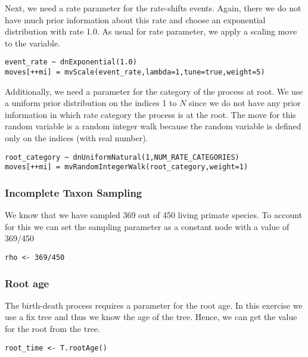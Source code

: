 Next, we need a rate parameter for the rate-shifts events.
Again, there we do not have much prior information about this rate and choose an exponential distribution with rate 1.0.
As usual for rate parameter, we apply a scaling move to the  variable.
{\tt \begin{snugshade*}
\begin{lstlisting}
event_rate ~ dnExponential(1.0)
moves[++mi] = mvScale(event_rate,lambda=1,tune=true,weight=5)
\end{lstlisting}
\end{snugshade*}}

Additionally, we need a parameter for the category of the process at root.
We use a uniform prior distribution on the indices 1 to $N$ since we do not have any prior information in which rate category the process is at the root.
The move for this random variable is a random integer walk because the random variable is defined only on the indices (\CF with real number).
{\tt \begin{snugshade*}
\begin{lstlisting}
root_category ~ dnUniformNatural(1,NUM_RATE_CATEGORIES)
moves[++mi] = mvRandomIntegerWalk(root_category,weight=1)
\end{lstlisting}
\end{snugshade*}}



\subsubsection{Incomplete Taxon Sampling}

We know that we have sampled 369 out of 450 living primate species. 
To account for this we can set the sampling parameter as a constant node with a value of 369/450
{\tt \begin{snugshade*}
\begin{lstlisting}
rho <- 369/450
\end{lstlisting}
\end{snugshade*}}


\subsubsection{Root age}

The birth-death process requires a parameter for the root age.
In this exercise we use a fix tree and thus we know the age of the tree.
Hence, we can get the value for the root from the \citet{Springer2012} tree.
{\tt \begin{snugshade*}
\begin{lstlisting}
root_time <- T.rootAge()
\end{lstlisting}
\end{snugshade*}}

